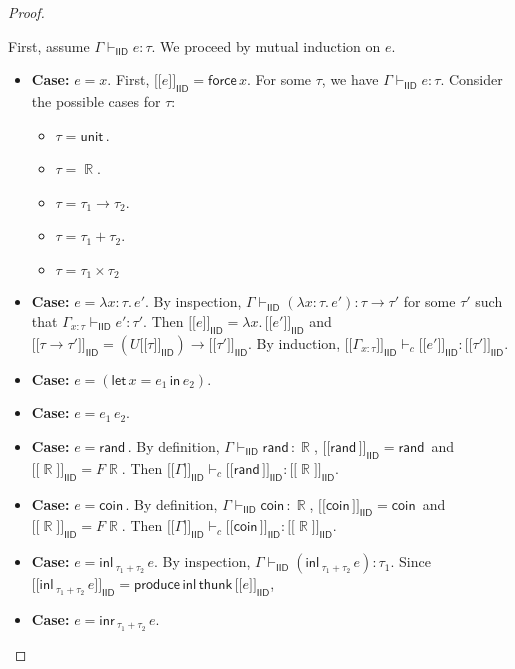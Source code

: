 \documentclass{article}
\DeclareMathOperator*\R{\mathbb{R}}
\newcommand{\iid}{\mathsf{IID}}
\newcommand{\unit}{\mathsf{unit\,}}
\newcommand{\letc}{\mathsf{let \,}}
\newcommand{\inc}{\mathsf{\, in \,}}
\newcommand{\rand}{\mathsf{rand\,}}
\newcommand{\coin}{\mathsf{coin\,}}
\newcommand{\inl}{\mathsf{inl\,}}
\newcommand{\inr}{\mathsf{inr\,}}
\newcommand{\1}{\mathsf{\,\#1\,}}
\newcommand{\2}{\mathsf{\,\#2\,}}
\newcommand{\force}{\mathsf{force \,}}
\newcommand{\thunk}{\mathsf{thunk \,}}
\newcommand{\produce}{\mathsf{produce \,}}
\newcommand{\semiid}[1]{[\![ #1 {]\!]}_{\mathsf{IID}}}
\begin{document}
\begin{proof}$\,$

First, assume $\Gamma \vdash_\iid e : \tau$.
We proceed by mutual induction on $e$.
\begin{itemize}
	\item {\bf Case:} $e = x$.
	First, $\semiid{e} = \force x$.
	For some $\tau$, we have $\Gamma \vdash_{\iid} e : \tau$.
	Consider the possible cases for $\tau$:
	\begin{itemize}
		\item $\tau = \unit$.
		\item $\tau = \R$.
		\item $\tau = \tau_1 \to \tau_2$.
		\item $\tau = \tau_1 + \tau_2$.
		\item $\tau = \tau_1 \times \tau_2$
	\end{itemize}
	
	\item {\bf Case:} $e = \lambda x : \tau .\, e'$.
	By inspection, $\Gamma \vdash_{\iid} (\lambda x : \tau .\, e') : \tau \to \tau'$ 
	for some $\tau'$ such that $\Gamma_{x : \tau} \vdash_{\iid}  e' : \tau'$.
	Then $\semiid{e} = \lambda x.\, \semiid{e'}$
	and $\semiid{\tau \to \tau'} = (U \semiid{\tau}) \to \semiid{\tau'}$.
	By induction, $\semiid{\Gamma_{x : \tau}} \vdash_c \semiid{e'} : \semiid{\tau'}$.
	
	\item {\bf Case:} $e = (\letc x = e_1 \inc e_2)$.
	
	\item {\bf Case:} $e = e_1\, e_2$.
	
	\item {\bf Case:} $e = \rand\!$.
	By definition, $\Gamma \vdash_\iid \rand : \R$,
	$\semiid{\rand} = \rand$ and $\semiid{\R} = F \R$.
	Then $\semiid{\Gamma} \vdash_c \semiid{\rand\!} : \semiid{\R}$.
	
	\item {\bf Case:} $e = \coin\!$.
	By definition, $\Gamma \vdash_\iid \coin : \R$,
	$\semiid{\coin} = \coin$ and $\semiid{\R} = F \R$.
	Then $\semiid{\Gamma} \vdash_c \semiid{\coin\!} : \semiid{\R}$.
	
	\item {\bf Case:} $e = \inl_{\tau_1 + \tau_2}\, e$.
	By inspection, $\Gamma \vdash_\iid (\inl_{\tau_1 + \tau_2}\, e) : \tau_1$.
	Since $\semiid{\inl_{\tau_1 + \tau_2}\, e} =  \produce \inl \thunk \semiid{e}$,
	
	\item {\bf Case:} $e = \inr_{\tau_1 + \tau_2}\, e$.
	

\end{itemize}
\end{proof}
\end{document}
